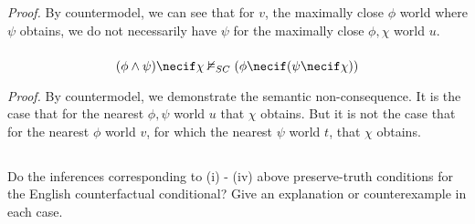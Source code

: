\documentclass{article}
\begin{document}
            \textit{Proof.}
            By countermodel, we can see that for $v$, the maximally close $\phi$ world where $\psi$ obtains, we do not necessarily have $\psi$ for the maximally close $\phi, \chi$ world $u$.
            \begin{center}
            \end{center}

            \subsubsection{}
            $$(\phi \wedge \psi) \necif \chi \nvDash_{SC} (\phi \necif (\psi \necif \chi))$$

            \textit{Proof.} By countermodel, we demonstrate the semantic non-consequence. 
            It is the case that for the nearest $\phi, \psi$ world $u$ that $\chi$ obtains.
            But it is not the case that for the nearest $\phi$ world $v$, for which the nearest $\psi$ world $t$, that $\chi$ obtains.

            \begin{center}
            \end{center}

        \subsection{}
        \begin{task}
            Do the inferences corresponding to (i) - (iv) above preserve-truth conditions for the 
            English counterfactual conditional? Give an explanation or counterexample in each case.
        \end{task}
\end{document}
